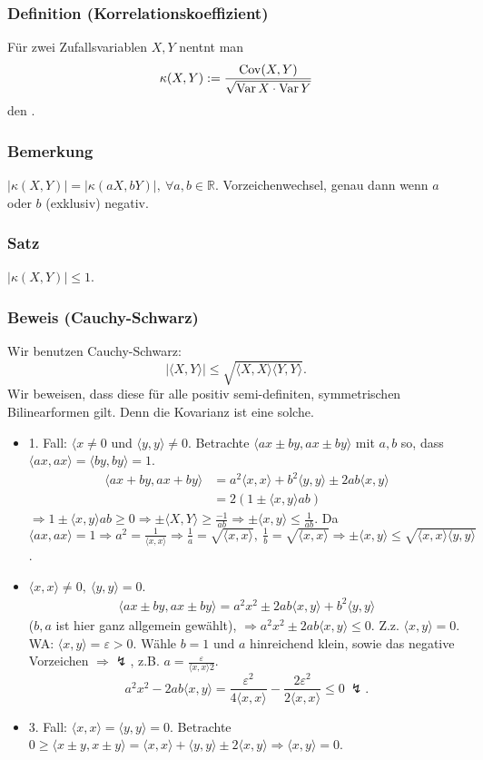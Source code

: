 \subsubsection{Definition (Korrelationskoeffizient)}
F\"ur zwei Zufallsvariablen $X,Y$ nentnt man
\[
\kappa(X,Y):=\frac{\operatorname{Cov}(X,Y)}{\sqrt{\operatorname{Var} X\cdot\operatorname{Var} Y}}
\]
den .
\subsubsection{Bemerkung}
$|\kappa(X,Y)|=|\kappa(aX,bY)|,\ \forall a,b\in\mathbb{R}$. Vorzeichenwechsel, genau dann wenn $a$ oder $b$ (exklusiv) negativ.
\subsubsection{Satz}
$|\kappa(X,Y)|\leq1$.
\subsubsection{Beweis (Cauchy-Schwarz)}
Wir benutzen Cauchy-Schwarz:
\[
|\langle X,Y\rangle|\leq\sqrt{\langle X,X\rangle\langle Y,Y\rangle}.
\]
Wir beweisen, dass diese f\"ur alle positiv semi-definiten, symmetrischen Bilinearformen gilt. Denn die Kovarianz ist eine solche.
\begin{itemize}
\item 1. Fall: $\langle x\neq0$ und $\langle y,y\rangle\neq0$. Betrachte $\langle ax\pm by,ax\pm by\rangle$ mit $a,b$ so, dass $\langle ax,ax\rangle=\langle by,by\rangle=1$.
\begin{align*}
\langle ax+by,ax+by\rangle&=a^2\langle x,x\rangle + b^2\langle y,y\rangle\pm 2ab\langle x,y\rangle\\
&=2(1\pm\langle x,y\rangle ab)
\end{align*}
$\Rightarrow 1\pm\langle x,y\rangle ab\geq0\Rightarrow\pm\langle X,Y\rangle\geq\frac{-1}{ab}\Rightarrow\pm\langle x,y\rangle\leq\frac{1}{ab}$. Da $\langle ax,ax\rangle=1\Rightarrow a^2=\frac{1}{\langle x,x\rangle}\Rightarrow\frac{1}{a}=\sqrt{\langle x,x\rangle},\ \frac{1}{b}=\sqrt{\langle x,x\rangle}\Rightarrow\pm\langle x,y\rangle\leq\sqrt{\langle x,x\rangle\langle y,y\rangle}$.
\item $\langle x,x\rangle\neq0,\ \langle y,y\rangle=0$.
\begin{align*}
\langle ax\pm by,ax\pm by\rangle=a^2x^2\pm 2ab\langle x,y\rangle+b^2\langle y,y\rangle
\end{align*}
($b,a$ ist hier ganz allgemein gew\"ahlt), $\Rightarrow a^2x^2\pm2ab\langle x,y\rangle\leq0$. Z.z. $\langle x,y\rangle=0$. WA: $\langle x,y\rangle=\varepsilon>0$. W\"ahle $b=1$ und $a$ hinreichend klein, sowie das negative Vorzeichen $\Rightarrow\lightning$, z.B. $a=\frac{\varepsilon}{\langle x,x\rangle2}$.
\[
a^2x^2-2ab\langle x,y\rangle=\frac{\varepsilon^2}{4\langle x,x\rangle}-\frac{2\varepsilon^2}{2\langle x,x\rangle}\leq0\ \lightning.
\]
\item 3. Fall: $\langle x,x\rangle=\langle y,y\rangle=0$. Betrachte $0\geq\langle x\pm y,x\pm y\rangle=\langle x,x\rangle+\langle y,y\rangle\pm2\langle x,y\rangle\Rightarrow\langle x,y\rangle=0$.
\end{itemize}
